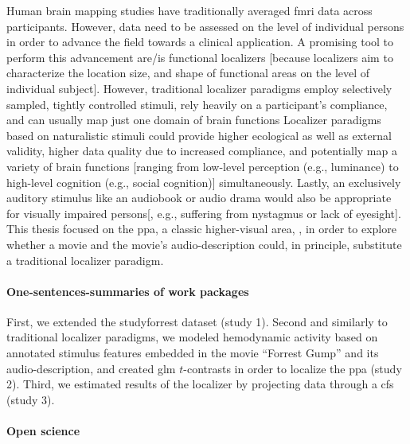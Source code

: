 
Human brain mapping studies have traditionally averaged \ac{fmri} data across
participants.
%
However, data need to be assessed on the level of individual persons in order to
advance the field towards a clinical application.
A promising tool to perform this advancement are/is functional localizers
[because localizers aim to characterize the location size, and shape of
functional areas on the level of individual subject].
However, traditional localizer paradigms employ selectively sampled, tightly
controlled stimuli, rely heavily on a participant's compliance, and can usually
map just one domain of brain functions
Localizer paradigms based on naturalistic stimuli could provide higher
ecological as well as external validity, higher data quality due to increased
compliance, and potentially map a variety of brain functions [ranging from
low-level perception (e.g., luminance) to high-level cognition (e.g., social
cognition)] simultaneously.
Lastly, an exclusively auditory stimulus like an audiobook or audio drama would
also be appropriate for visually impaired persons[, e.g., suffering from
nystagmus or lack of eyesight].
This thesis focused on the \ac{ppa}, a classic higher-visual area,
\citep{epstein1998ppa}, in order to explore whether a movie and the movie's
audio-description could, in principle, substitute a traditional localizer
paradigm.


\paragraph{One-sentences-summaries of work packages}


%
First, we extended the studyforrest dataset (study 1).
%
Second and similarly to traditional localizer paradigms, we modeled hemodynamic
activity based on annotated stimulus features embedded in the movie ``Forrest
Gump'' and its audio-description, and created \ac{glm} $t$-contrasts in order to
localize the \ac{ppa} (study 2).
%
Third, we estimated results of the localizer by projecting data through a
\ac{cfs} (study 3).


\paragraph{Open science}

